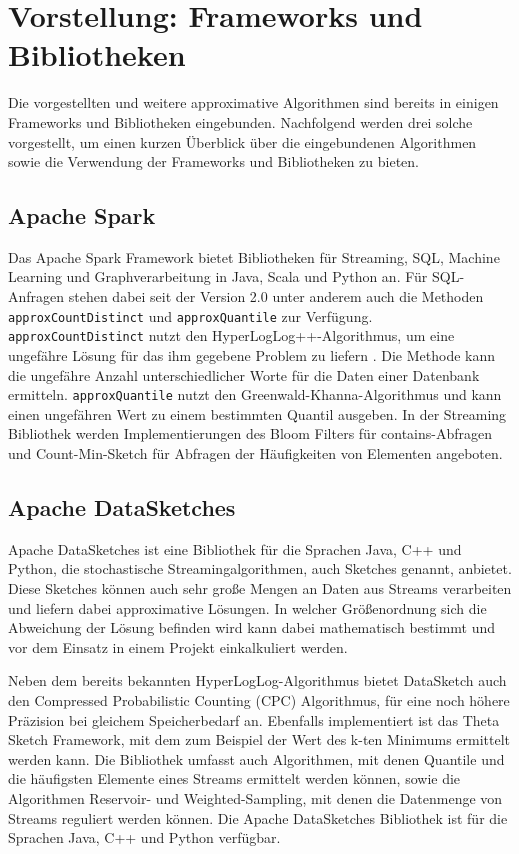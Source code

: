\section{Vorstellung: Frameworks und Bibliotheken}
Die vorgestellten und weitere approximative Algorithmen sind bereits in einigen Frameworks und Bibliotheken eingebunden. Nachfolgend werden drei solche vorgestellt, um einen kurzen Überblick über die eingebundenen Algorithmen sowie die Verwendung der Frameworks und Bibliotheken zu bieten.

\subsection{Apache Spark}
Das Apache Spark Framework bietet Bibliotheken für Streaming, SQL, Machine Learning und Graphverarbeitung in Java, Scala und Python an. 
Für SQL-Anfragen stehen dabei seit der Version 2.0 unter anderem auch die Methoden \texttt{approxCountDistinct} 
und \texttt{approxQuantile} zur Verfügung. 
\texttt{approxCountDistinct} nutzt den Hyper\-LogLog++-Algorithmus, 
um eine ungefähre Lösung für das ihm gegebene Problem zu liefern \cite{hunter2016}.
Die Methode kann die ungefähre Anzahl unterschiedlicher Worte für die Daten einer Datenbank ermitteln.
\texttt{approxQuantile} nutzt den Greenwald-Khanna-Algorithmus \cite{greenwald2001} 
und kann einen ungefähren Wert zu einem bestimmten Quantil ausgeben.
In der Streaming Bibliothek werden Implementierungen des Bloom Filters für contains-Abfragen und Count-Min-Sketch für Abfragen der Häufigkeiten von Elementen angeboten.

\subsection{Apache DataSketches}
Apache DataSketches ist eine Bibliothek für die Sprachen Java, C++ und Python, die stochastische Streamingalgorithmen, 
auch Sketches genannt, anbietet. 
Diese Sketches können auch sehr große Mengen an Daten aus Streams verarbeiten 
und liefern dabei approximative Lösungen. 
In welcher Größenordnung sich die Abweichung der Lösung befinden wird kann dabei mathematisch bestimmt 
und vor dem Einsatz in einem Projekt einkalkuliert werden.

Neben dem bereits bekannten HyperLogLog-Algorithmus bietet DataSketch auch den Compressed Probabilistic Counting (CPC) Algorithmus, 
für eine noch höhere Präzision bei gleichem Speicherbedarf an.
Ebenfalls implementiert ist das Theta Sketch Framework, 
mit dem zum Beispiel der Wert des k-ten Minimums ermittelt werden kann.
Die Bibliothek umfasst auch Algorithmen, mit denen Quantile und die häufigsten Elemente eines Streams ermittelt werden können, 
sowie die Algorithmen Reservoir- und Weighted-Sampling, mit denen die Datenmenge von Streams reguliert werden können.
Die Apache DataSketches Bibliothek ist für die Sprachen Java, C++ und Python verfügbar.

